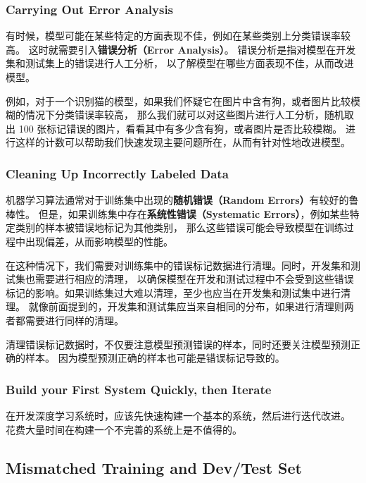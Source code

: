 \subsubsection{Carrying Out Error Analysis}

有时候，模型可能在某些特定的方面表现不佳，例如在某些类别上分类错误率较高。
这时就需要引入\textbf{错误分析（Error Analysis）}。
错误分析是指对模型在开发集和测试集上的错误进行人工分析，
以了解模型在哪些方面表现不佳，从而改进模型。

例如，对于一个识别猫的模型，如果我们怀疑它在图片中含有狗，或者图片比较模糊的情况下分类错误率较高，
那么我们就可以对这些图片进行人工分析，随机取出 100 张标记错误的图片，看看其中有多少含有狗，或者图片是否比较模糊。
进行这样的计数可以帮助我们快速发现主要问题所在，从而有针对性地改进模型。

\subsubsection{Cleaning Up Incorrectly Labeled Data}

机器学习算法通常对于训练集中出现的\textbf{随机错误（Random Errors）}有较好的鲁棒性。
但是，如果训练集中存在\textbf{系统性错误（Systematic Errors）}，例如某些特定类别的样本被错误地标记为其他类别，
那么这些错误可能会导致模型在训练过程中出现偏差，从而影响模型的性能。

在这种情况下，我们需要对训练集中的错误标记数据进行清理。同时，开发集和测试集也需要进行相应的清理，
以确保模型在开发和测试过程中不会受到这些错误标记的影响。如果训练集过大难以清理，至少也应当在开发集和测试集中进行清理。
就像前面提到的，开发集和测试集应当来自相同的分布，如果进行清理则两者都需要进行同样的清理。

\begin{hint}
    清理错误标记数据时，不仅要注意模型预测错误的样本，同时还要关注模型预测正确的样本。
    因为模型预测正确的样本也可能是错误标记导致的。
\end{hint}

\subsubsection{Build your First System Quickly, then Iterate}

在开发深度学习系统时，应该先快速构建一个基本的系统，然后进行迭代改进。
花费大量时间在构建一个不完善的系统上是不值得的。

\subsection{Mismatched Training and Dev/Test Set}

